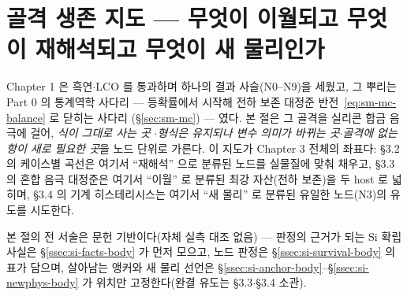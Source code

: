 \section{골격 생존 지도 --- 무엇이 이월되고 무엇이 재해석되고 무엇이 새 물리인가}\label{sec:si-map}
Chapter 1 은 흑연$\cdot$LCO 를 통과하며 하나의 결과 사슬(N0--N9)을 세웠고, 그 뿌리는 Part 0 의
통계역학 사다리 --- 등확률에서 시작해 전하 보존 대정준 반전~\eqref{eq:sm-mc-balance} 로 닫히는 사다리
(\S\ref{sec:sm-mc}) --- 였다. 본 절은 그 골격을 실리콘 합금 음극에 걸어, \emph{식이 그대로 사는 곳}
$\cdot$\emph{형식은 유지되나 변수 의미가 바뀌는 곳}$\cdot$\emph{골격에 없는 항이 새로 필요한 곳}을 노드
단위로 가른다. 이 지도가 Chapter 3 전체의 좌표다: §3.2 의 케이스별 곡선은 여기서 ``재해석'' 으로
분류된 노드를 실물질에 맞춰 채우고, §3.3 의 혼합 음극 대정준은 여기서 ``이월'' 로 분류된 최강 자산(전하
보존)을 두 host 로 넓히며, §3.4 의 기계 히스테리시스는 여기서 ``새 물리'' 로 분류된 유일한 노드(N3)의
유도를 시도한다.

본 절의 전 서술은 문헌 기반이다(자체 실측 대조 없음) --- 판정의 근거가 되는 Si 확립 사실은
\S\ref{ssec:si-facts-body} 가 먼저 모으고, 노드 판정은 \S\ref{ssec:si-survival-body} 의 표가 담으며,
살아남는 앵커와 새 물리 선언은 \S\ref{ssec:si-anchor-body}--\S\ref{ssec:si-newphys-body} 가 위치만
고정한다(완결 유도는 §3.3$\cdot$§3.4 소관).

